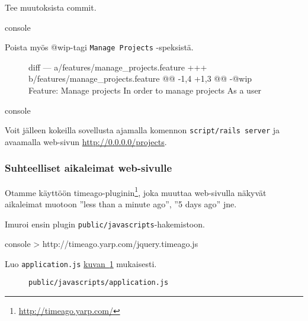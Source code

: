 \documentclass{article}
\newenvironment{myfigure}[1][tbp]{
  \begin{figure}[#1]
    \centering
    \begin{lrbox}{\myfigurebox}
      \begin{minipage}{\textwidth}
}{
      \end{minipage}
    \end{lrbox}
    \colorbox{blue!4}{\usebox{\myfigurebox}}
  \end{figure}
}
\newcommand{\myref}[2]{\hyperref[#2]{#1~\ref*{#2}}}
\newcommand{\pdfforeignlanguage}[2]{\texorpdfstring{\foreignlanguage{#1}{#2}}{#2}}
\newcommand{\eng}[1]{\pdfforeignlanguage{english}{#1}}
\begin{document}
\begin{samepage}
Tee muutoksista commit.

\begin{pygmented}{console}
\end{pygmented}
\end{samepage}

\begin{samepage}
Poista myös @wip-tagi \texttt{Manage Projects} -speksistä.

\begin{myfigure}[H]
\begin{pygmented}{diff}
--- a/features/manage_projects.feature
+++ b/features/manage_projects.feature
@@ -1,4 +1,3 @@
-@wip
 Feature: Manage projects
   In order to manage projects
   As a user
\end{pygmented}
\end{myfigure}

\begin{pygmented}{console}
\end{pygmented}
\end{samepage}

Voit jälleen kokeilla sovellusta ajamalla komennon \texttt{script/rails server}
ja avaamalla web-sivun \url{http://0.0.0.0/projects}.

\subsubsection{Suhteelliset aikaleimat web-sivulle}

Otamme käyttöön timeago-pluginin\footnote{\url{http://timeago.yarp.com/}}, joka
muuttaa web-sivulla näkyvät aikaleimat muotoon ''\eng{less than a minute
ago}'', ''\eng{5 days ago}'' jne.

\begin{samepage}
Imuroi ensin plugin \texttt{public/javascripts}-hakemistoon.

\begin{pygmented}{console}
> http://timeago.yarp.com/jquery.timeago.js
\end{pygmented}
\end{samepage}

\begin{samepage}
Luo \texttt{application.js} \myref{kuvan}{fig:application-js-00} mukaisesti.

\begin{myfigure}[H]
\caption{\texttt{public/javascripts/application.js}}
\label{fig:application-js-00}

\end{myfigure}
\end{samepage}
\end{document}
